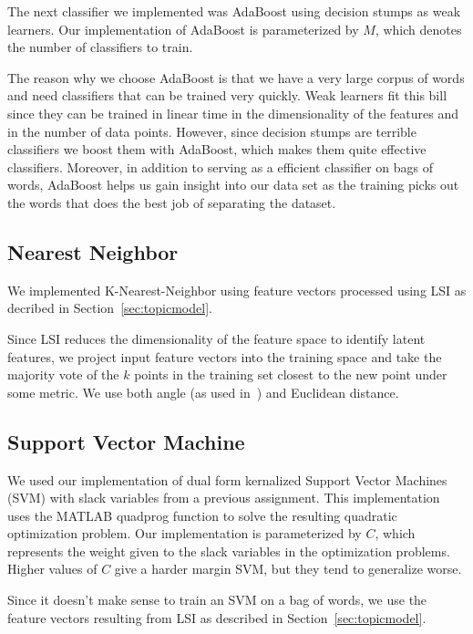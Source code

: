 \documentclass[10pt, twocolumn]{article}
\begin{document}
The next classifier we implemented was AdaBoost using decision stumps as weak learners.
Our implementation of AdaBoost is parameterized by $M$, which denotes the number of classifiers to train.

The reason why we choose AdaBoost is that we have a very large corpus of words and need classifiers that can be trained very quickly.
Weak learners fit this bill since they can be trained in linear time in the dimensionality of the features and in the number of data points.
However, since decision stumps are terrible classifiers we boost them with AdaBoost, which makes them quite effective classifiers.
Moreover, in addition to serving as a efficient classifier on bags of words, AdaBoost helps us gain insight into our data set as the training picks out the words that does the best job of separating the dataset.

\subsection{Nearest Neighbor}
\label{sec:nearest-neighbor}

We implemented K-Nearest-Neighbor using feature vectors processed using LSI as decribed in Section~\ref{sec:topicmodel}.

Since LSI reduces the dimensionality of the feature space to identify latent features, we project input feature vectors into the training space and take the majority vote of the $k$ points in the training set closest to the new point under some metric. We use both angle (as used in~\cite{lsi}) and Euclidean distance.

\subsection{Support Vector Machine}
\label{sec:svm}

We used our implementation of dual form kernalized Support Vector Machines (SVM) with slack variables from a previous assignment.
This implementation uses the MATLAB quadprog function to solve the resulting quadratic optimization problem.
Our implementation is parameterized by $C$, which represents the weight given to the slack variables in the optimization problems. Higher values of $C$ give a harder margin SVM, but they tend to generalize worse.

Since it doesn't make sense to train an SVM on a bag of words, we use the feature vectors resulting from LSI as described in Section~\ref{sec:topicmodel}.
\end{document}
